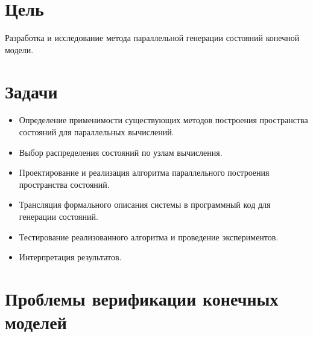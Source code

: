 \documentclass[12pt]{article}
\begin{document}
\TitleSlide

\section{Цель}
\label{sec:goal}

\mbox{}

\mbox{}

\hline
\begin{center}
  Разработка и исследование метода параллельной генерации состояний конечной модели.
\end{center}
\hline

\section{Задачи}
\label{sec:tasks}

\small
\begin{itemize}
\item Определение применимости существующих методов построения пространства состояний для
  параллельных вычислений.
\item Выбор распределения состояний по узлам вычисления.
\item Проектирование и реализация алгоритма параллельного построения пространства состояний.
\item Трансляция формального описания системы в программный код для генерации состояний.
\item Тестирование реализованного алгоритма и проведение экспериментов.
\item Интерпретация результатов.
\end{itemize}
\normalsize




\section{Проблемы верификации конечных моделей}
\label{sec:verif-troubles}
\end{document}
